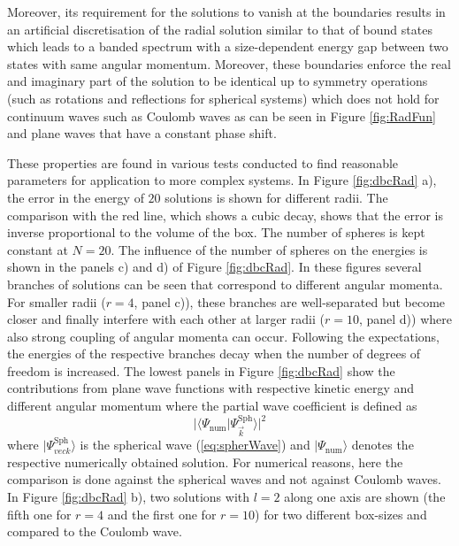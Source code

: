 Moreover, its requirement for the solutions to vanish at the boundaries results in an artificial discretisation of the radial solution similar to that of bound states which leads to a banded spectrum with a size-dependent energy gap between two states with same angular momentum.
Moreover, these boundaries enforce the real and imaginary part of the solution to be identical up to symmetry operations (such as rotations and reflections for spherical systems) which does not hold for continuum waves such as Coulomb waves as can be seen in Figure \ref{fig:RadFun} and plane waves that have a constant phase shift.

These properties are found in various tests conducted to find reasonable parameters for application to more complex systems.
In Figure \ref{fig:dbcRad} a), the error in the energy of $20$ solutions is shown for different radii.
The comparison with the red line, which shows a cubic decay, shows that the error is inverse proportional to the volume of the box. 
The number of spheres is kept constant at $N=20$.
The influence of the number of spheres on the energies is shown in the panels c) and d) of Figure \ref{fig:dbcRad}.
In these figures several branches of solutions can be seen that correspond to different angular momenta.
For smaller radii ($r=4$, panel c)), these branches are well-separated but become closer and finally interfere with each other at larger radii ($r=10$, panel d)) where also strong coupling of angular momenta can occur.
Following the expectations, the energies of the respective branches decay when the number of degrees of freedom is increased.
The lowest panels in Figure \ref{fig:dbcRad} show the contributions from plane wave functions with respective kinetic energy and different angular momentum where the partial wave coefficient is defined as
\begin{equation} \label{eq:PartWaveCoeff}
|\langle \Psi_\text{num} | \Psi_{\vec{k}}^\text{Sph}\rangle |^2
\end{equation}
where $|\Psi_{vec{k}}^\text{Sph}\rangle$ is the spherical wave (\ref{eq:spherWave}) and $|\Psi_\text{num}\rangle$ denotes the respective numerically obtained solution.
For numerical reasons, here the comparison is done against the spherical waves and not against Coulomb waves.
In Figure \ref{fig:dbcRad} b), two solutions with $l=2$ along one axis are shown (the fifth one for $r=4$ and the first one for $r=10$) for two different box-sizes and compared to the Coulomb wave.

